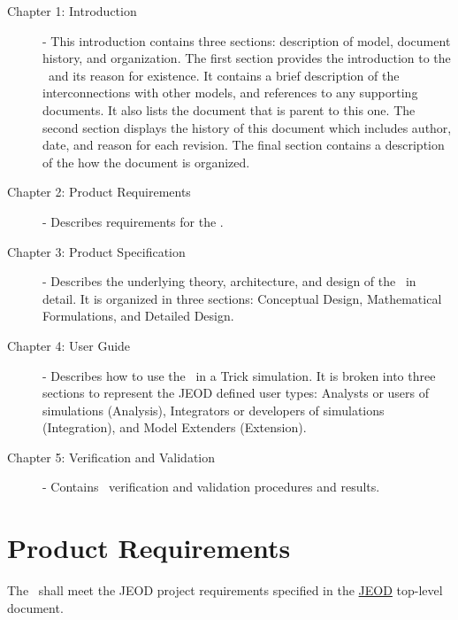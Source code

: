 \begin{description}

\item[Chapter 1: Introduction] - 
This introduction contains three sections: description of model, document history, and organization.  
The first section provides the introduction to the \gravitytorqueDesc\ and its reason 
for existence.  It contains a brief description of the interconnections with other models, and 
references to any supporting documents. It also lists the document that is parent to this one.  
The second section displays the history of this document which includes
author, date, and reason for each revision.  The final
section contains a description of the how the document is organized.

\item[Chapter 2: Product Requirements] - 
Describes requirements for the \gravitytorqueDesc.

\item[Chapter 3: Product Specification] - 
Describes the underlying theory, architecture, and design of the \gravitytorqueDesc\ in detail.  It is organized in 
three sections: Conceptual Design, Mathematical Formulations, and Detailed Design.

\item[Chapter 4: User Guide] - 
Describes how to use the \gravitytorqueDesc\ in a Trick simulation.  It is broken into three sections to represent the JEOD 
defined user types: Analysts or users of simulations (Analysis), Integrators or developers of simulations (Integration),
and Model Extenders (Extension).

\item[Chapter 5: Verification and Validation] -  
Contains \gravitytorqueDesc\ verification and validation procedures and results.

\end{description}

\chapter{Product Requirements}\label{ch:reqt}
The \gravitytorqueDesc\ shall meet the JEOD project requirements specified in the 
\hyperref{file:\JEODHOME/docs/JEOD.pdf}{part1}{reqt}{JEOD} top-level document.

